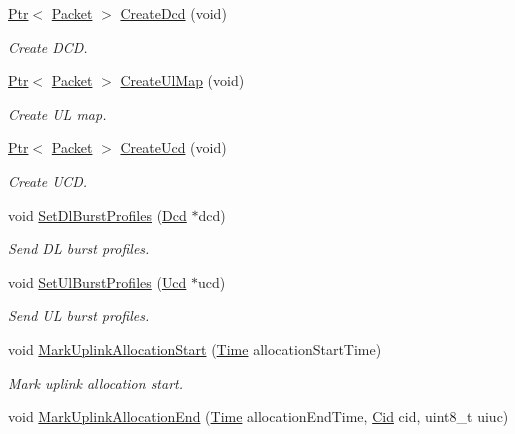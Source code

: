 \begin{DoxyCompactItemize}
\hyperlink{classns3_1_1Ptr}{Ptr}$<$ \hyperlink{classns3_1_1Packet}{Packet} $>$ \hyperlink{classns3_1_1BaseStationNetDevice_a4228fe5a44d28453e2a1188ac4d31e8d}{Create\+Dcd} (void)
\begin{DoxyCompactList}\small\item\em Create D\+CD. \end{DoxyCompactList}\item 
\hyperlink{classns3_1_1Ptr}{Ptr}$<$ \hyperlink{classns3_1_1Packet}{Packet} $>$ \hyperlink{classns3_1_1BaseStationNetDevice_a73d0eb6a57169fc627126d2e37de9f20}{Create\+Ul\+Map} (void)
\begin{DoxyCompactList}\small\item\em Create UL map. \end{DoxyCompactList}\item 
\hyperlink{classns3_1_1Ptr}{Ptr}$<$ \hyperlink{classns3_1_1Packet}{Packet} $>$ \hyperlink{classns3_1_1BaseStationNetDevice_abdd5d28aac407818503b3ffae29bd1de}{Create\+Ucd} (void)
\begin{DoxyCompactList}\small\item\em Create U\+CD. \end{DoxyCompactList}\item 
void \hyperlink{classns3_1_1BaseStationNetDevice_a2110651b30bbf78969c831dacb1b655d}{Set\+Dl\+Burst\+Profiles} (\hyperlink{classns3_1_1Dcd}{Dcd} $\ast$dcd)
\begin{DoxyCompactList}\small\item\em Send DL burst profiles. \end{DoxyCompactList}\item 
void \hyperlink{classns3_1_1BaseStationNetDevice_afe815d0fff8c6152ceeb93beff282255}{Set\+Ul\+Burst\+Profiles} (\hyperlink{classns3_1_1Ucd}{Ucd} $\ast$ucd)
\begin{DoxyCompactList}\small\item\em Send UL burst profiles. \end{DoxyCompactList}\item 
void \hyperlink{classns3_1_1BaseStationNetDevice_a5dba5c57e8bb0daa9078235a047268ec}{Mark\+Uplink\+Allocation\+Start} (\hyperlink{classns3_1_1Time}{Time} allocation\+Start\+Time)
\begin{DoxyCompactList}\small\item\em Mark uplink allocation start. \end{DoxyCompactList}\item 
void \hyperlink{classns3_1_1BaseStationNetDevice_a8adcdd3212410b4ef091658d701b99fa}{Mark\+Uplink\+Allocation\+End} (\hyperlink{classns3_1_1Time}{Time} allocation\+End\+Time, \hyperlink{classns3_1_1Cid}{Cid} cid, uint8\+\_\+t uiuc)

\end{DoxyCompactItemize}
